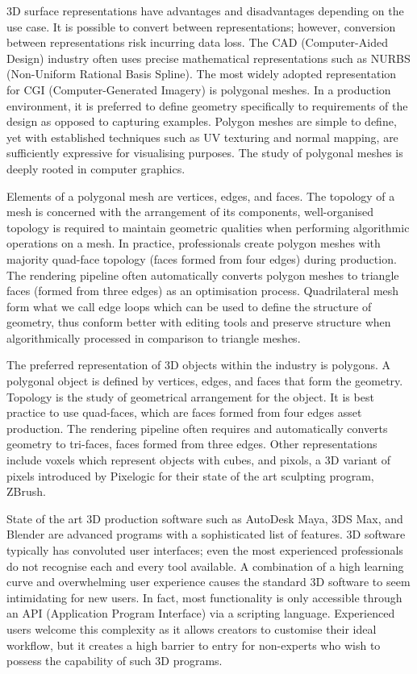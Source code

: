 \documentclass[a4paper, fontsize=15pt, onecolumn]{article} %
\numberwithin{equation}{section} %
\numberwithin{figure}{section} %
\numberwithin{table}{section} %
\begin{document}
3D surface representations have advantages and disadvantages depending on the use case. It is possible to convert between representations; however, conversion between representations risk incurring data loss. The CAD (Computer-Aided Design) industry often uses precise mathematical representations such as NURBS (Non-Uniform Rational Basis Spline). The most widely adopted representation for CGI (Computer-Generated Imagery) is polygonal meshes. In a production environment, it is preferred to define geometry specifically to requirements of the design as opposed to capturing examples. Polygon meshes are simple to define, yet with established techniques such as UV texturing and normal mapping, are sufficiently expressive for visualising purposes. The study of polygonal meshes is deeply rooted in computer graphics.

Elements of a polygonal mesh are vertices, edges, and faces. The topology of a mesh is concerned with the arrangement of its components, well-organised topology is required to maintain geometric qualities
when performing algorithmic operations on a mesh. In practice, professionals create polygon meshes with majority quad-face topology (faces formed from four edges) during production. The rendering pipeline often automatically converts polygon meshes to triangle faces (formed from three edges) as an optimisation process. Quadrilateral mesh form what we call edge loops which can be used to define the structure of geometry, thus conform better with editing tools and preserve structure when algorithmically processed in comparison to triangle meshes.

The preferred representation of 3D objects within the industry is polygons. A polygonal object is defined by vertices, edges, and faces that form the geometry. Topology is the study of geometrical arrangement for the object. It is best practice to use quad-faces, which are faces formed from four edges asset production. The rendering pipeline often requires and automatically converts geometry to tri-faces, faces formed from three edges. Other representations include voxels which represent objects with cubes, and pixols, a 3D variant of pixels introduced by Pixelogic for their state of the art sculpting program, ZBrush.

State of the art 3D production software such as AutoDesk Maya, 3DS Max, and Blender are advanced
programs with a sophisticated list of features. 3D software typically has convoluted user interfaces; even the most experienced professionals do not recognise each and every tool available. A combination of a high learning curve and overwhelming user experience causes the standard 3D software to seem intimidating for new users. In fact, most functionality is only accessible through an API (Application Program Interface) via a scripting language. Experienced users welcome this complexity as it allows creators to customise their ideal workflow, but it creates a high barrier to entry for non-experts who wish to possess the capability of such 3D programs.
\end{document}
